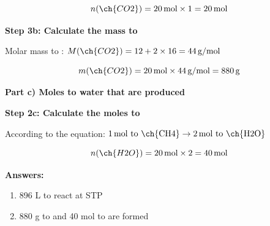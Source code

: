 \begin{exercise}
\begin{solu}
        \begin{equation*}
            n(\ch{CO2}) = 20\,\text{mol} \times 1 = 20\,\text{mol}
        \end{equation*}

        \textbf{Step 3b: Calculate the mass to }

        Molar mass to : $M(\ch{CO2}) = 12 + 2 \times 16 = 44\,\text{g/mol}$

        \begin{equation*}
            m(\ch{CO2}) = 20\,\text{mol} \times 44\,\text{g/mol} = 880\,\text{g}
        \end{equation*}

        \textbf{Part c) Moles to water that are produced}

        \textbf{Step 2c: Calculate the moles to }

        According to the equation: $1\,\text{mol to \ch{CH4}} \rightarrow 2\,\text{mol to \ch{H2O}}$

        \begin{equation*}
            n(\ch{H2O}) = 20\,\text{mol} \times 2 = 40\,\text{mol}
        \end{equation*}

        \textbf{Answers:}
        \begin{enumerate}[label=\letraminuscula]
            \item 896 L to  react at STP
            \item 880 g to  and 40 mol to  are formed
        \end{enumerate}
    \end{solu}
\end{exercise}

